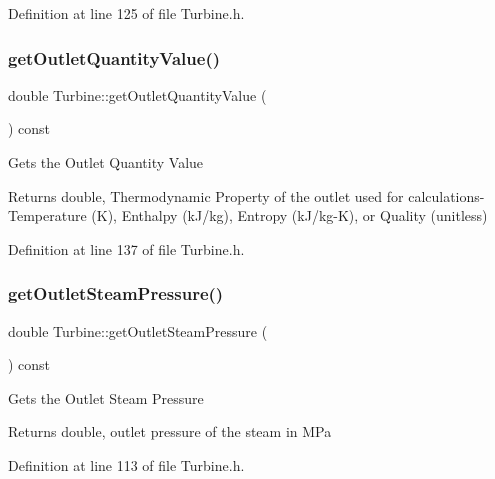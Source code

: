 Definition at line 125 of file Turbine.\+h.

\mbox{\label{class_turbine_aca98f128213e02e95dfd6f4b2ad8de4e}} 
\subsubsection{\texorpdfstring{get\+Outlet\+Quantity\+Value()}{getOutletQuantityValue()}}
{\footnotesize\ttfamily double Turbine\+::get\+Outlet\+Quantity\+Value (\begin{DoxyParamCaption}{ }\end{DoxyParamCaption}) const\hspace{0.3cm}{\ttfamily [inline]}}

Gets the Outlet Quantity Value

\begin{DoxyReturn}{Returns}
double, Thermodynamic Property of the outlet used for calculations-\/ Temperature (K), Enthalpy (k\+J/kg), Entropy (k\+J/kg-\/K), or Quality (unitless) 
\end{DoxyReturn}


Definition at line 137 of file Turbine.\+h.

\mbox{\label{class_turbine_a1589b2364a553db7aaa875bb543d171d}} 
\subsubsection{\texorpdfstring{get\+Outlet\+Steam\+Pressure()}{getOutletSteamPressure()}}
{\footnotesize\ttfamily double Turbine\+::get\+Outlet\+Steam\+Pressure (\begin{DoxyParamCaption}{ }\end{DoxyParamCaption}) const\hspace{0.3cm}{\ttfamily [inline]}}

Gets the Outlet Steam Pressure

\begin{DoxyReturn}{Returns}
double, outlet pressure of the steam in M\+Pa 
\end{DoxyReturn}


Definition at line 113 of file Turbine.\+h.


